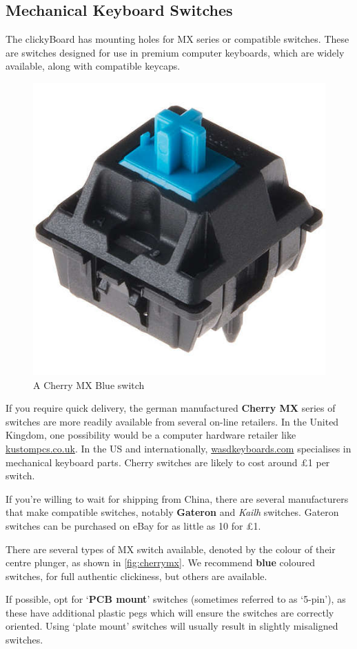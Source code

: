 \documentclass[10pt, a4paper, onesided]{article}
\begin{document}
	\subsection{Mechanical Keyboard Switches}
	
	The clickyBoard has mounting holes for MX series or compatible switches. These are switches designed for use in premium computer keyboards, which are widely available, along with compatible keycaps.
	
	\begin{figure}[h]
		\centering
		\includegraphics[width=0.25\linewidth]{img/cherrymx}
		\caption{A Cherry MX Blue switch}
		\label{fig:cherrymx}
	\end{figure}
	
	If you require quick delivery, the german manufactured \textbf{Cherry MX} series of switches are more readily available from several on-line retailers. In the United Kingdom, one possibility would be a computer hardware retailer like \href{http://www.kustompcs.co.uk/acatalog/Keys_and_Accessories.html}{kustompcs.co.uk}. In the US and internationally, \href{http://www.wasdkeyboards.com/index.php/products/keyboard-parts.html}{wasdkeyboards.com} specialises in mechanical keyboard parts. Cherry switches are likely to cost around \pounds1 per switch.
	
	If you're willing to wait for shipping from China, there are several manufacturers that make compatible switches, notably \textbf{Gateron} and \textit{Kailh} switches. Gateron switches can be purchased on eBay for as little as 10 for \pounds1.
	
	There are several types of MX switch available, denoted by the colour of their centre plunger, as shown in \autoref*{fig:cherrymx}. We recommend \textbf{blue} coloured switches, for full authentic clickiness, but others are available.
	
	If possible, opt for `\textbf{PCB mount}' switches (sometimes referred to as `5-pin'), as these have additional plastic pegs which will ensure the switches are correctly oriented. Using `plate mount' switches will usually result in slightly misaligned switches.
	
\end{document}
